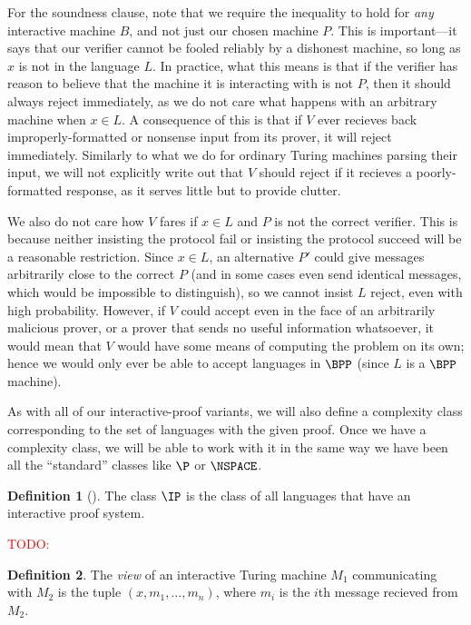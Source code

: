 \documentclass[english,12pt]{reedthesis}
\theoremstyle{plain}
\theoremstyle{definition}
\newtheorem{defn}[defn]{Definition}
\theoremstyle{remark}
\newcommand{\TODO}[1]{\textcolor{red}{TODO: #1}}
\begin{document}
For the soundness clause, note that we require the inequality to hold for
\emph{any} interactive machine $B$, and not just our chosen machine $P$. This is
important---it says that our verifier cannot be fooled reliably by a dishonest
machine, so long as $x$ is not in the language $L$. In practice, what this means
is that if the verifier has reason to believe that the machine it is interacting
with is not $P$, then it should always reject immediately, as we do not care
what happens with an arbitrary machine when $x \in L$. A consequence of this is
that if $V$ ever recieves back improperly-formatted or nonsense input from its
prover, it will reject immediately. Similarly to what we do for ordinary Turing
machines parsing their input, we will not explicitly write out that $V$ should
reject if it recieves a poorly-formatted response, as it serves little but to
provide clutter.

We also do not care how $V$ fares if $x \in L$ and $P$ is not the correct
verifier. This is because neither insisting the protocol fail or insisting the
protocol succeed will be a reasonable restriction. Since $x \in L$, an alternative
$P'$ could give messages arbitrarily close to the correct $P$ (and in some cases
even send identical messages, which would be impossible to distinguish), so we
cannot insist $L$ reject, even with high probability. However, if $V$ could
accept even in the face of an arbitrarily malicious prover, or a prover that
sends no useful information whatsoever, it would mean that $V$ would have some
means of computing the problem on its own; hence we would only ever be able to
accept languages in $\BPP$ (since $L$ is a $\BPP$ machine).

As with all of our interactive-proof variants, we will also define a complexity
class corresponding to the set of languages with the given proof. Once we have a
complexity class, we will be able to work with it in the same way we have been
all the ``standard'' classes like $\P$ or $\NSPACE$.

\begin{defn}[{\cite[Def.\ 4.2.5]{Go01}}]\label{def:ip}
  The class $\IP$ is the class of all languages that have an interactive proof
  system.
\end{defn}

\TODO{}

\begin{defn}\label{def:view-ip}
  The \emph{view} of an interactive Turing machine $M_{1}$ communicating with
  $M_{2}$ is the tuple $(x, m_{1}, \ldots, m_{n})$, where $m_{i}$ is the $i$th
  message recieved from $M_{2}$.
\end{defn}
\end{document}
